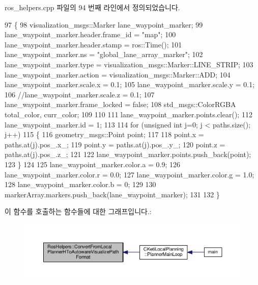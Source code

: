 ros\+\_\+helpers.\+cpp 파일의 94 번째 라인에서 정의되었습니다.


\begin{DoxyCode}
97 \{
98   visualization\_msgs::Marker lane\_waypoint\_marker;
99   lane\_waypoint\_marker.header.frame\_id = \textcolor{stringliteral}{"map"};
100   lane\_waypoint\_marker.header.stamp = ros::Time();
101   lane\_waypoint\_marker.ns = \textcolor{stringliteral}{"global\_lane\_array\_marker"};
102   lane\_waypoint\_marker.type = visualization\_msgs::Marker::LINE\_STRIP;
103   lane\_waypoint\_marker.action = visualization\_msgs::Marker::ADD;
104   lane\_waypoint\_marker.scale.x = 0.1;
105   lane\_waypoint\_marker.scale.y = 0.1;
106   \textcolor{comment}{//lane\_waypoint\_marker.scale.z = 0.1;}
107   lane\_waypoint\_marker.frame\_locked = \textcolor{keyword}{false};
108   std\_msgs::ColorRGBA  total\_color, curr\_color;
109 
110 
111   lane\_waypoint\_marker.points.clear();
112   lane\_waypoint\_marker.id = 1;
113 
114   \textcolor{keywordflow}{for} (\textcolor{keywordtype}{unsigned} \textcolor{keywordtype}{int} j=0; j < paths.size(); j++)
115   \{
116     geometry\_msgs::Point point;
117 
118     point.x = paths.at(j).pos\_.x\_;
119     point.y = paths.at(j).pos\_.y\_;
120     point.z = paths.at(j).pos\_.z\_;
121 
122     lane\_waypoint\_marker.points.push\_back(point);
123   \}
124 
125   lane\_waypoint\_marker.color.a = 0.9;
126   lane\_waypoint\_marker.color.r = 0.0;
127   lane\_waypoint\_marker.color.g = 1.0;
128   lane\_waypoint\_marker.color.b = 0;
129 
130   markerArray.markers.push\_back(lane\_waypoint\_marker);
131 
132 \}
\end{DoxyCode}


이 함수를 호출하는 함수들에 대한 그래프입니다.\+:\nopagebreak
\begin{figure}[H]
\begin{center}
\leavevmode
\includegraphics[width=350pt]{class_ros_helpers_a00357e856ae16110fd9f3787cc3802d3_icgraph}
\end{center}
\end{figure}


